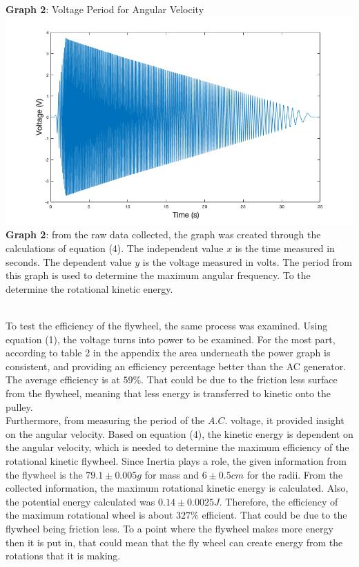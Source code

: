 \documentclass[11pt]{article}
\begin{document}
\begin{center}
    \textbf{Graph 2}: Voltage Period for Angular Velocity\\
    \includegraphics[width=17cm]{2.png}\\\textbf{Graph 2}: from the raw data collected, the graph was created through the calculations of equation (4). The independent value $x$ is the time measured in seconds. The dependent value $y$ is the voltage measured in volts. The period from this graph is used to determine the maximum angular frequency. To the determine the rotational kinetic energy. 
\end{center}
\\To test the efficiency of the flywheel, the same process was examined. Using equation (1), the voltage turns into power to be examined. For the most part, according to table 2 in the appendix the area underneath the power graph is consistent, and providing an efficiency percentage better than the AC generator. The average efficiency is at $59\%$. That could be due to the friction less surface from the flywheel, meaning that less energy is transferred to kinetic onto the pulley.\\
Furthermore, from measuring the period of the $A.C.$ voltage, it provided insight on the angular velocity. Based on equation (4), the kinetic energy is dependent on the angular velocity, which is needed to determine the maximum efficiency of the rotational kinetic flywheel. Since Inertia plays a role, the given information from the flywheel is the $79.1\pm0.005 g$ for mass and $6\pm 0.5cm$ for the radii. From the collected information, the maximum rotational kinetic energy is calculated. Also, the potential energy calculated was $0.14\pm0.0025 J$. Therefore, the efficiency of the maximum rotational wheel is about $327\%$ efficient. That could be due to the flywheel being friction less. To a point where the flywheel makes more energy then it is put in, that could mean that the fly wheel can create energy from the rotations that it is making.
\end{document}
